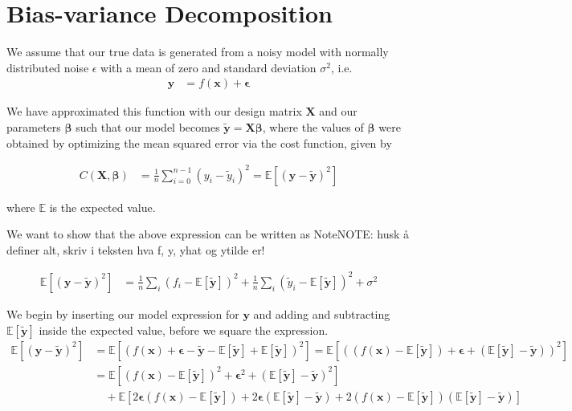 \documentclass[reprint,english,notitlepage,aps,nobalancelastpage,nofootinbib]{revtex4-1}  %
\newcommand{\expy}{\mathbb{E}[\mathbf{\tilde{y}}]}
\newcommand{\closed}[1]{\left({#1}\right)}
\newcommand{\bracket}[1]{\left[{#1}\right]}
\begin{document}
\appendix


\section{Bias-variance Decomposition}\label{Apx:BVT}

We assume that our true data is generated from a noisy model with normally distributed noise $\epsilon$ with a mean of zero and standard deviation $\sigma^2$, i.e.
\begin{align*}
  \mathbf{y} &= f(\mathbf{x}) + \bm{\epsilon}
\end{align*}

We have approximated this function with our design matrix $\mathbf{X}$ and our parameters $\bm{\beta}$ such that our model becomes $\mathbf{\tilde{y}}=\mathbf{X}\bm{\beta}$, where the values of $\bm{\beta}$ were obtained by optimizing the mean squared error via the cost function, given by

\begin{align*}
  C(\mathbf{X}, \bm{\beta}) &= \frac{1}{n} \sum_{i=0}^{n-1} (y_i - \tilde{y}_i)^2 = \mathbb{E}\left[(\mathbf{y} - \mathbf{\tilde{y}})^2\right]
\end{align*}


where $\mathbb{E}$ is the expected value. %

We want to show that the above expression can be written as
NoteNOTE: husk å definer alt, skriv i teksten hva f, y, yhat og ytilde er!

\begin{align*}
  \mathbb{E}\left[(\mathbf{y} - \mathbf{\tilde{y}})^2\right] &= \frac{1}{n} \sum_i (f_i - \expy)^2 + \frac{1}{n}\sum_i (\tilde{y}_i - \expy )^2 + \sigma^2
\end{align*}

We begin by inserting our model expression for $\mathbf{y}$ and adding and subtracting $\expy$ inside the expected value, before we square the expression.
\begin{align*}
  \mathbb{E}\bracket{(\mathbf{y} - \mathbf{\tilde{y}})^2} &= \mathbb{E}\bracket{(f(\mathbf{x}) + \bm{\epsilon} - \mathbf{\tilde{y}} - \expy + \expy)^2} = \mathbb{E}\bracket{\closed{(f(\mathbf{x}) - \expy) + \bm{\epsilon} + (\expy - \mathbf{\tilde{y}}) }^2 } \\
  &= \mathbb{E}\bracket{(f(\mathbf{x}) - \expy)^2 + \bm{\epsilon}^2 + (\expy - \mathbf{\tilde{y}})^2} \\
  &\quad+ \mathbb{E}\bracket{2\bm{\epsilon} (f(\mathbf{x}) - \expy) + 2\bm{\epsilon}(\expy - \mathbf{\tilde{y}}) + 2 (f(\mathbf{x}) - \expy)(\expy - \mathbf{\tilde{y}})}
\end{align*}
\end{document}
